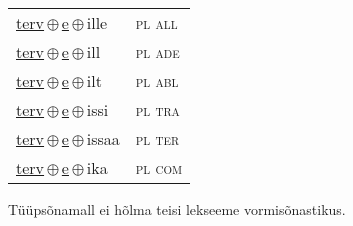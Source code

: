 \begin{minipage}{\textwidth}
\begin{sideways}
\begin{tabular}{l l}
\underline{terv}\,$\oplus$\,\underline{e}\,$\oplus$\,ille & \textsc{ pl all } \\
\underline{terv}\,$\oplus$\,\underline{e}\,$\oplus$\,ill & \textsc{ pl ade } \\
\underline{terv}\,$\oplus$\,\underline{e}\,$\oplus$\,ilt & \textsc{ pl abl } \\
\underline{terv}\,$\oplus$\,\underline{e}\,$\oplus$\,issi & \textsc{ pl tra } \\
\underline{terv}\,$\oplus$\,\underline{e}\,$\oplus$\,issaa & \textsc{ pl ter } \\
\underline{terv}\,$\oplus$\,\underline{e}\,$\oplus$\,ika & \textsc{ pl com } \\
\end{tabular}
\end{sideways}
\label{tab:tüüpsõnamall-terve}

\end{minipage}

 
\vspace{1em}
\noindent Tüüpsõnamall  ei hõlma teisi lekseeme vormi\-sõnastikus.
